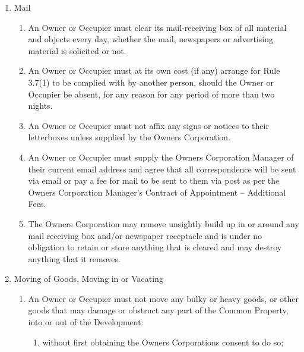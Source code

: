 \documentclass{article}
\begin{document}
\begin{enumerate}[label=\arabic*.]
\begin{enumerate}[label=\arabic{enumi}.\arabic*.]
\begin{enumerate}[label=(\arabic*)]
\begin{enumerate}[label=(\arabic*)]
\end{enumerate}

\item  Mail

\begin{enumerate}[label=(\arabic*)]

\item  An Owner or Occupier must clear its mail-receiving box of all material and objects every day, whether the mail, newspapers or advertising material is solicited or not.

\item  An Owner or Occupier must at its own cost (if any) arrange for Rule 3.7(1) to be complied with by another person, should the Owner or Occupier be absent, for any reason for any period of more than two nights.
\newpage



\item  An Owner or Occupier must not affix any signs or notices to their letterboxes unless supplied by the Owners Corporation.

\item  An Owner or Occupier must supply the Owners Corporation Manager of their current email address and agree that all correspondence will be sent via email or pay a fee for mail to be sent to them via post as per the Owners Corporation Manager’s Contract of Appointment – Additional Fees.

\item  The Owners Corporation may remove unsightly build up in or around any mail receiving box and/or newspaper receptacle and is under no obligation to retain or store anything that is cleared and may destroy anything that it removes.

\end{enumerate}

\item  Moving of Goods, Moving in or Vacating

\begin{enumerate}[label=(\arabic*)]

\item  An Owner or Occupier must not move any bulky or heavy goods, or other goods that may damage or obstruct any part of the Common Property, into or out of the Development:

\begin{enumerate}[label=(\alph*)]

\item  without first obtaining the Owners Corporations consent to do so;


\end{enumerate}
\end{enumerate}
\end{enumerate}
\end{enumerate}
\end{enumerate}
\end{document}
